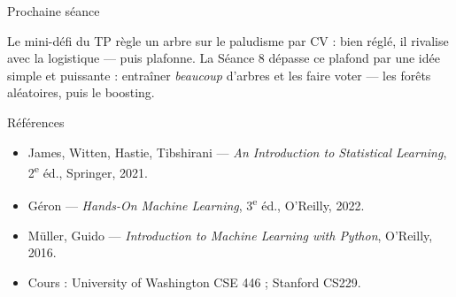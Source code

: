\documentclass[aspectratio=169,11pt]{beamer}
\begin{document}
\begin{frame}{Prochaine séance}
\begin{ucadfront}
{\small Le mini-défi du TP règle un arbre sur le paludisme par CV : bien réglé, il rivalise avec la logistique — puis plafonne. La Séance 8 dépasse ce plafond par une idée simple et puissante : entraîner \emph{beaucoup} d'arbres et les faire voter — les forêts aléatoires, puis le boosting.}
\end{ucadfront}
\end{frame}

\begin{frame}{Références}
\begin{itemize}\small
  \item James, Witten, Hastie, Tibshirani — \emph{An Introduction to Statistical Learning}, 2\textsuperscript{e} éd., Springer, 2021.
  \item Géron — \emph{Hands-On Machine Learning}, 3\textsuperscript{e} éd., O'Reilly, 2022.
  \item Müller, Guido — \emph{Introduction to Machine Learning with Python}, O'Reilly, 2016.
  \item Cours : University of Washington CSE 446 ; Stanford CS229.
\end{itemize}
\end{frame}
\end{document}
